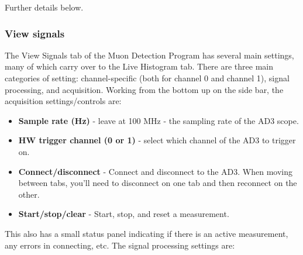 \documentclass{../lab}
\begin{document}
Further details below.

\subsubsection{View signals}

The View Signals tab of the Muon Detection Program has several main settings, many of which carry over to the Live Histogram tab. There are three main categories of setting: channel-specific (both for channel 0 and channel 1), signal processing, and acquisition. Working from the bottom up on the side bar, the acquisition settings/controls are:

\begin{itemize}
    \item \textbf{Sample rate (Hz)} - leave at 100 MHz - the sampling rate of the AD3 scope.
    \item \textbf{HW trigger channel (0 or 1)} - select which channel of the AD3 to trigger on.
    \item \textbf{Connect/disconnect} - Connect and disconnect to the AD3. When moving between tabs, you'll need to disconnect on one tab and then reconnect on the other.
    \item \textbf{Start/stop/clear} - Start, stop, and reset a measurement.
\end{itemize}

This also has a small status panel indicating if there is an active measurement, any errors in connecting, etc. The signal processing settings are:
\end{document}

